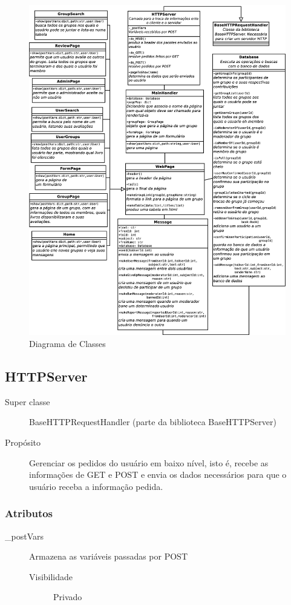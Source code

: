 \documentclass[a4paper]{article}
\begin{document}
 \begin{figure}[H]
  \includegraphics[totalheight=0.75\textheight]{classes.eps}
  \caption{Diagrama de Classes}
 \end{figure}
 
 \subsection{HTTPServer}
 
	\begin{description}
		\item [Super classe] BaseHTTPRequestHandler (parte da biblioteca BaseHTTPServer)
		\item [Propósito] Gerenciar os pedidos do usuário em baixo nível, isto é, recebe as informações de GET e POST e envia os dados necessários para que o usuário receba a informação pedida.
	\end{description}
	
	\subsubsection{Atributos}
		\begin{description}
		 \item [\_postVars] Armazena as variáveis passadas por POST
			\begin{description}
			 \item [Visibilidade] Privado
			\end{description}

		\end{description}
\end{document}
